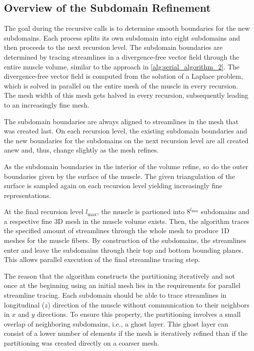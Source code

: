 \subsection{Overview of the Subdomain Refinement}

The goal during the recursive calls is to determine smooth boundaries for the new subdomains. Each process splits its own subdomain into eight subdomains and then proceeds to the next recursion level.
The subdomain boundaries are determined by tracing streamlines in a divergence-free vector field through the entire muscle volume, similar to the approach in \cref{alg:serial_algorithm_2}. The divergence-free vector field is computed from the solution of a Laplace problem, which is solved in parallel on the entire mesh of the muscle in every recursion. The mesh width of this mesh gets halved in every recursion, subsequently leading to an increasingly fine mesh.

The subdomain boundaries are always aligned to streamlines in the mesh that was created last.
On each recursion level, the existing subdomain boundaries and the new boundaries for the subdomains on the next recursion level are all created anew and, thus, change slightly as the mesh refines.

As the subdomain boundaries in the interior of the volume refine, so do the outer boundaries given by the surface of the muscle. The given triangulation of the surface is sampled again on each recursion level yielding increasingly fine representations.

At the final recursion level $l_\text{max}$, the muscle is partioned into $8^{l_\text{max}}$ subdomains and a respective fine 3D mesh in the muscle volume exists. Then, the algorithm traces the specified amount of streamlines through the whole mesh to produce 1D meshes for the muscle fibers. By construction of the subdomains, the streamlines enter and leave the subdomains through their top and bottom bounding planes. This allows parallel execution of the final streamline tracing step.

The reason that the algorithm constructs the partitioning iteratively and not once at the beginning using an initial mesh lies in the requirements for parallel streamline tracing. Each subdomain should be able to trace streamlines in longitudinal ($z$) direction of the muscle without communication to their neighbors in $x$ and $y$ directions. To ensure this property, the partitioning involves a small overlap of neighboring subdomains, i.e., a ghost layer. This ghost layer can consist of a lower number of elements if the mesh is iteratively refined than if the partitioning was created directly on a coarser mesh.


